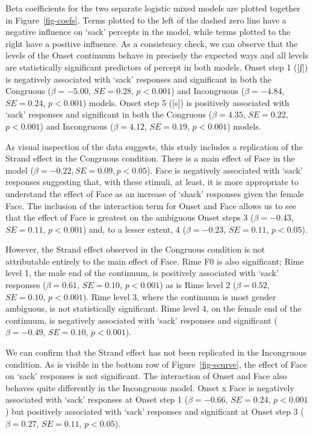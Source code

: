 \documentclass[
  letterpaper,
  DIV=11,
  numbers=noendperiod]{scrartcl}
\begin{document}
Beta coefficients for the two separate logistic mixed models are plotted
together in Figure~\ref{fig-coefs}. Terms plotted to the left of the
dashed zero line have a negative influence on `sack' percepts in the
model, while terms plotted to the right have a positive influence. As a
consistency check, we can observe that the levels of the Onset continuum
behave in precisely the expected ways and all levels are statistically
significant predictors of percept in both models. Onset step 1 ({[}ʃ{]})
is negatively associated with `sack' responses and significant in both
the Congruous (\(β=-5.00\), \(SE=0.28\), \(p < 0.001\)) and Incongruous
(\(β=-4.84\), \(SE=0.24\), \(p < 0.001\)) models. Onset step 5 ({[}s{]})
is positively associated with `sack' responses and significant in both
the Congruous (\(β=4.35\), \(SE=0.22\), \(p < 0.001\)) and Incongruous
(\(β=4.12\), \(SE=0.19\), \(p < 0.001\)) models.

As visual inspection of the data suggests, this study includes a
replication of the Strand effect in the Congruous condition. There is a
main effect of Face in the model (\(β=-0.22, SE=0.09, p<0.05\)). Face is
negatively associated with `sack' responses suggesting that, with these
stimuli, at least, it is more appropriate to understand the effect of
Face as an increase of `shack' responses given the female Face. The
inclusion of the interaction term for Onset and Face allows us to see
that the effect of Face is greatest on the ambiguous Onset steps 3
(\(β=-0.43\), \(SE=0.11\), \(p < 0.001\)) and, to a lesser extent, 4
(\(β=-0.23\), \(SE=0.11\), \(p < 0.05\)).

However, the Strand effect observed in the Congruous condition is not
attributable entirely to the main effect of Face. Rime F0 is also
significant; Rime level 1, the male end of the continuum, is positively
associated with `sack' responses (\(β=0.61\), \(SE=0.10\),
\(p < 0.001\)) as is Rime level 2 (\(β=0.52\), \(SE=0.10\),
\(p < 0.001\)). Rime level 3, where the continuum is most gender
ambiguous, is not statistically significant. Rime level 4, on the female
end of the continuum, is negatively associated with `sack' responses and
significant (\(β=-0.49\), \(SE=0.10\), \(p < 0.001\)).

We can confirm that the Strand effect has not been replicated in the
Incongruous condition. As is visible in the bottom row of
Figure~\ref{fig-scurve}, the effect of Face on `sack' responses is not
significant. The interaction of Onset and Face also behaves quite
differently in the Incongruous model. Onset x Face is negatively
associated with `sack' responses at Onset step 1 (\(β=-0.66\),
\(SE=0.24\), \(p < 0.001\)) but positively associated with `sack'
responses and significant at Onset step 3 (\(β=0.27\), \(SE=0.11\),
\(p < 0.05\)).
\end{document}
